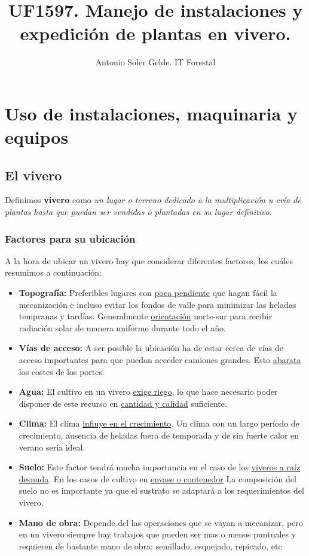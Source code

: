 \documentclass[a4paper,12pt,oneside]{article}
\author{Antonio Soler Gelde. IT Forestal}
\date{}
\title{UF1597. Manejo de instalaciones y expedición de plantas en vivero.}
\begin{document}
\maketitle
\thispagestyle{empty} \tableofcontents \clearpage
\section{Uso de instalaciones, maquinaria y equipos}
\label{sec:org3260823}
\subsection{El vivero}
\label{sec:org76e638b}
Definimos \textbf{vivero} como \emph{un lugar o terreno dedicado a la multiplicación u cría
de plantas hasta que puedan ser vendidas o plantadas en su lugar definitivo}. 
\subsubsection{Factores para su ubicación}
\label{sec:orgac0fbde}
A la hora de ubicar un vivero hay que considerar diferentes factores, los cuáles
resumimos a continuación:
\begin{itemize}
\item \textbf{Topografía:} Preferibles lugares con \uline{poca pendiente} que hagan fácil la
mecanización e incluso evitar los  fondos de valle para minimizar las heladas
tempranas y tardías. Generalmente \uline{orientación} norte-sur para recibir
radiación solar de manera uniforme durante todo el año.
\item \textbf{Vías de acceso:} A ser posible la ubicación ha de estar cerca de vías de
acceso importantes para que puedan acceder camiones grandes. Esto \uline{abarata}
los costes de los portes.
\item \textbf{Agua:} El cultivo en un vivero \uline{exige riego}, lo que hace necesario poder
disponer de este recurso en \uline{cantidad y calidad} suficiente.
\item \textbf{Clima:} El clima \uline{influye en el crecimiento}. Un clima con un largo período de
crecimiento, ausencia de heladas fuera de temporada y de sin fuerte calor en
verano sería ideal.
\item \textbf{Suelo:} Este factor tendrá mucha importancia en el caso de los \uline{viveros a
raíz desnuda}. En los casos de cultivo en \uline{envase o contenedor} La composición
del suelo no es importante ya que el sustrato se adaptará a los
requerimientos del vivero.
\item \textbf{Mano de obra:} Depende del las operaciones que se vayan a mecanizar, pero en
un vivero siempre hay trabajos que pueden ser mas o menos puntuales y
requieren  de bastante mano de obra: semillado, esquejado, repicado, etc
\end{itemize}
\end{document}
